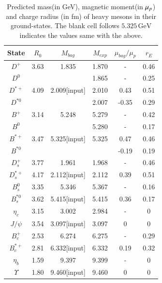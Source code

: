 \documentclass[prd,twocolumn,floatfix,nofootinbib]{revtex4}
\begin{document}
\renewcommand{\tabcolsep}{0.3cm} \renewcommand{\arraystretch}{1.3}
\begin{table}[!htb]
\caption{Predicted mass(in GeV), magnetic moment(in $\protect\mu_{p}$) and
charge radius (in fm) of heavy mesons in their ground-states. The blank cell
follows $5.325\,\mathrm{GeV}$ indicates the values same with the above.}
\label{tab:heavymeson}%
\begin{tabular}{cccccc}
\hline\hline
\textrm{State} & $R_{0}$ & $M_{bag}$ & $M_{exp}$ & $\mu_{bag}/\mu_{p}$ & $%
r_{E}$ \\ \hline
$D^{+}$ & 3.63 & 1.835 & 1.870 & - & 0.46 \\
$D^{0}$ &  &  & 1.865 & - & 0.25 \\
$D^{\ast +}$ & 4.09 & 2.009[input] & 2.010 & 0.43 & 0.51 \\
$D^{\ast 0}$ &  &  & 2.007 & -0.35 & 0.29 \\
$B^{+}$ & 3.14 & 5.248 & 5.279 & - & 0.42 \\
$B^{0}$ &  &  & 5.280 & - & 0.17 \\
$B^{\ast +}$ & 3.47 & 5.325[input] & 5.325 & 0.47 & 0.46 \\
$B^{\ast 0}$ &  &  &  & -0.19 & 0.19 \\
$D_{s}^{+}$ & 3.77 & 1.961 & 1.968 & - & 0.46 \\
$D_{s}^{\ast +}$ & 4.17 & 2.112[input] & 2.112 & 0.39 & 0.51 \\
$B_{s}^{0}$ & 3.35 & 5.346 & 5.367 & - & 0.16 \\
$B_{s}^{\ast 0}$ & 3.62 & 5.415[input] & 5.415 & 0.36 & 0.17 \\
$\eta_{c}$ & 3.15 & 3.002 & 2.984 & - & 0 \\
$J/\psi$ & 3.54 & 3.097[input] & 3.097 & 0 & 0 \\
$B_{c}^{+}$ & 2.53 & 6.274 & 6.275 & - & 0.29 \\
$B_{c}^{\ast +}$ & 2.81 & 6.332[input] & 6.332 & 0.19 & 0.32 \\
$\eta_{b}$ & 1.59 & 9.397 & 9.399 & - & 0 \\
$\Upsilon$ & 1.80 & 9.460[input] & 9.460 & 0 & 0 \\ \hline\hline
\end{tabular}%
\end{table}
\end{document}
